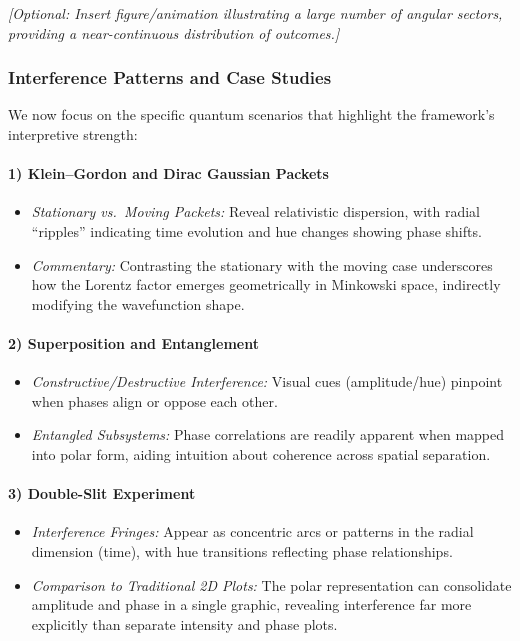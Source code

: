 \documentclass{article}
\begin{document}
\noindent
\textit{[Optional: Insert figure/animation illustrating a large number of angular sectors, providing a near-continuous distribution of outcomes.]}


\subsubsection{Interference Patterns and Case Studies}
We now focus on the specific quantum scenarios that highlight the framework’s interpretive strength:

\paragraph{1) Klein--Gordon and Dirac Gaussian Packets}
\begin{itemize}
    \item \textit{Stationary vs.\ Moving Packets:} Reveal relativistic dispersion, with radial “ripples” indicating time evolution and hue changes showing phase shifts.
    \item \textit{Commentary:} Contrasting the stationary with the moving case underscores how the Lorentz factor emerges geometrically in Minkowski space, indirectly modifying the wavefunction shape.
\end{itemize}

\paragraph{2) Superposition and Entanglement}
\begin{itemize}
    \item \textit{Constructive/Destructive Interference:} Visual cues (amplitude/hue) pinpoint when phases align or oppose each other.
    \item \textit{Entangled Subsystems:} Phase correlations are readily apparent when mapped into polar form, aiding intuition about coherence across spatial separation.
\end{itemize}

\paragraph{3) Double-Slit Experiment}
\begin{itemize}
    \item \textit{Interference Fringes:} Appear as concentric arcs or patterns in the radial dimension (time), with hue transitions reflecting phase relationships.
    \item \textit{Comparison to Traditional 2D Plots:} The polar representation can consolidate amplitude and phase in a single graphic, revealing interference far more explicitly than separate intensity and phase plots.
\end{itemize}
\end{document}
